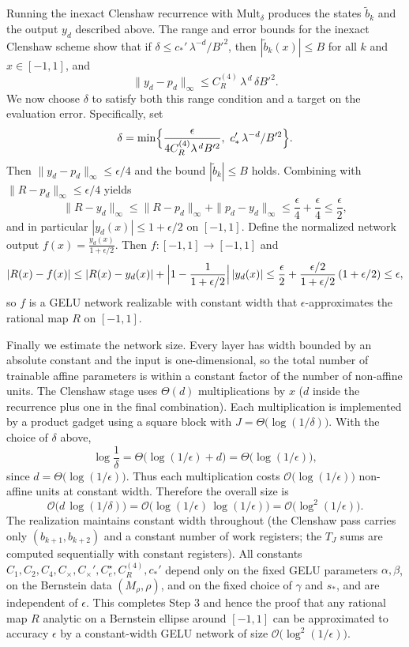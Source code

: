 \documentclass{article}
\theoremstyle{plain}
\theoremstyle{definition}
\theoremstyle{remark}
\begin{document}
Running the inexact Clenshaw recurrence with $\mathrm{Mult}_\delta$ produces the states $\tilde b_k$ and the output $y_d$ described above. The range and error bounds for the inexact Clenshaw scheme show that if \(\delta\le c_*'\,\lambda^{-d}/B'^2\), then $|\tilde b_k(x)|\le B$ for all $k$ and $x\in[-1,1]$, and
\[
\|y_d-p_d\|_\infty\le C_R^{(4)}\,\lambda^{\,d}\,\delta B'^2.
\]
We now choose $\delta$ to satisfy both this range condition and a target on the evaluation error. Specifically, set
\[
\delta=\min\Bigl\{\frac{\epsilon}{4 C_R^{(4)} \lambda^{\,d} B'^2},\ c_*'\,\lambda^{-d}/B'^2\Bigr\}.
\]
Then $\|y_d-p_d\|_\infty\le \epsilon/4$ and the bound $|\tilde b_k|\le B$ holds. Combining with $\|R-p_d\|_\infty\le \epsilon/4$ yields
\[
\|R-y_d\|_\infty\le \|R-p_d\|_\infty+\|p_d-y_d\|_\infty\le \frac{\epsilon}{4}+\frac{\epsilon}{4}\le \frac{\epsilon}{2},
\]
and in particular $|y_d(x)|\le 1+\epsilon/2$ on $[-1,1]$. Define the normalized network output \(f(x)=\frac{y_d(x)}{1+\epsilon/2}\). Then $f:[-1,1]\to[-1,1]$ and
\[
|R(x)-f(x)|\le |R(x)-y_d(x)|+\Bigl|1-\frac{1}{1+\epsilon/2}\Bigr|\,|y_d(x)|
\le \frac{\epsilon}{2}+\frac{\epsilon/2}{1+\epsilon/2}\,(1+\epsilon/2)\le \epsilon,
\]
so $f$ is a GELU network realizable with constant width that $\epsilon$-approximates the rational map $R$ on $[-1,1]$.

Finally we estimate the network size. Every layer has width bounded by an absolute constant and the input is one-dimensional, so the total number of trainable affine parameters is within a constant factor of the number of non-affine units. The Clenshaw stage uses $\Theta(d)$ multiplications by $x$ ($d$ inside the recurrence plus one in the final combination). Each multiplication is implemented by a product gadget using a square block with $J=\Theta\!\bigl(\log(1/\delta)\bigr)$. With the choice of $\delta$ above,
\[
\log\frac{1}{\delta}=\Theta\bigl(\log(1/\epsilon)+d\bigr)=\Theta\bigl(\log(1/\epsilon)\bigr),
\]
since $d=\Theta\bigl(\log(1/\epsilon)\bigr)$. Thus each multiplication costs $\mathcal{O}\bigl(\log(1/\epsilon)\bigr)$ non-affine units at constant width. Therefore the overall size is
\[
\mathcal{O}\bigl(d\,\log(1/\delta)\bigr)
=\mathcal{O}\bigl(\log(1/\epsilon)\,\log(1/\epsilon)\bigr)
=\mathcal{O}\bigl(\log^2(1/\epsilon)\bigr).
\]
The realization maintains constant width throughout (the Clenshaw pass carries only $(b_{k+1},b_{k+2})$ and a constant number of work registers; the $T_J$ sums are computed sequentially with constant registers). All constants $C_1,C_2,C_4,C_\times,C_\times',C_e^\star,C_R^{(4)},c_*'$ depend only on the fixed GELU parameters $\alpha,\beta$, on the Bernstein data $(M_\rho,\rho)$, and on the fixed choice of $\gamma$ and $s_*$, and are independent of $\epsilon$. This completes Step 3 and hence the proof that any rational map $R$ analytic on a Bernstein ellipse around $[-1,1]$ can be approximated to accuracy $\epsilon$ by a constant-width GELU network of size $\mathcal{O}\bigl(\log^2(1/\epsilon)\bigr)$.
\end{document}

